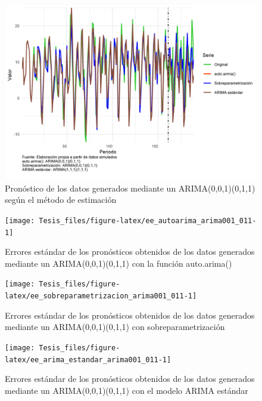 \documentclass[
]{article}
\begin{document}
\begin{figure}[H]
\includegraphics[width=1\linewidth,height=1\textheight]{Tesis_files/figure-latex/pronostico_arima001_011-1} \caption{Pronóstico de los datos generados mediante un ARIMA(0,0,1)(0,1,1) según el método de estimación}\label{fig:pronostico_arima001_011}
\end{figure}

\begin{figure}[H]
\texttt{[image: Tesis\_files/figure-latex/ee\_autoarima\_arima001\_011-1]} \caption{Errores estándar de los pronósticos obtenidos de los datos generados mediante un ARIMA(0,0,1)(0,1,1) con la función auto.arima()}\label{fig:ee_autoarima_arima001_011}
\end{figure}

\begin{figure}[H]
\texttt{[image: Tesis\_files/figure-latex/ee\_sobreparametrizacion\_arima001\_011-1]} \caption{Errores estándar de los pronósticos obtenidos de los datos generados mediante un ARIMA(0,0,1)(0,1,1) con sobreparametrización}\label{fig:ee_sobreparametrizacion_arima001_011}
\end{figure}

\begin{figure}[H]
\texttt{[image: Tesis\_files/figure-latex/ee\_arima\_estandar\_arima001\_011-1]} \caption{Errores estándar de los pronósticos obtenidos de los datos generados mediante un ARIMA(0,0,1)(0,1,1) con el modelo ARIMA estándar}\label{fig:ee_arima_estandar_arima001_011}
\end{figure}
\end{document}
